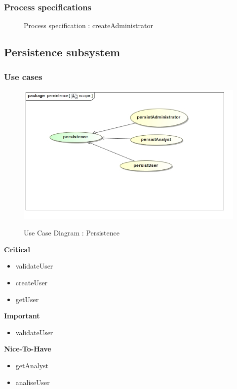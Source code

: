 \documentclass{article}
\begin{document}
		\subsubsection{Process specifications}

		\begin{figure}[H]
		\caption{Process specification : createAdministrator}
		\end{figure}

	\subsection{Persistence subsystem}
		\subsubsection{Use cases}

		\begin{figure}[H]
		\includegraphics[width=\textwidth]{images/uc__persistence__scope.jpg}  \\
		\caption{Use Case Diagram : Persistence}
		\end{figure}

		\begin{flushleft}
			\textbf{Critical}
				\begin{itemize}
					\item validateUser
					\item createUser
					\item getUser
				\end{itemize}
			\textbf{Important}
				\begin{itemize}
					\item validateUser
				\end{itemize}

			\textbf{Nice-To-Have}
				\begin{itemize}
					\item getAnalyst
					\item analiseUser
				\end{itemize}
		\end{flushleft}
\end{document}

